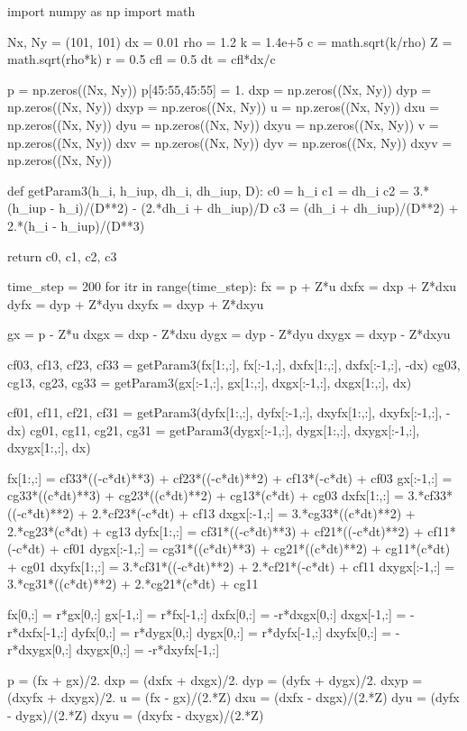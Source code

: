 \documentclass[dvipdfmx, 9pt, a4paper]{jsarticle}
\begin{document}
\begin{python}
import numpy as np
import math

Nx, Ny = (101, 101)
dx = 0.01
rho = 1.2
k = 1.4e+5
c = math.sqrt(k/rho)
Z = math.sqrt(rho*k)
r = 0.5
cfl = 0.5
dt = cfl*dx/c

p = np.zeros((Nx, Ny))
p[45:55,45:55] = 1.
dxp = np.zeros((Nx, Ny))
dyp = np.zeros((Nx, Ny))
dxyp = np.zeros((Nx, Ny))
u = np.zeros((Nx, Ny))
dxu = np.zeros((Nx, Ny))
dyu = np.zeros((Nx, Ny))
dxyu = np.zeros((Nx, Ny))
v = np.zeros((Nx, Ny))
dxv = np.zeros((Nx, Ny))
dyv = np.zeros((Nx, Ny))
dxyv = np.zeros((Nx, Ny))

def getParam3(h_i, h_iup, dh_i, dh_iup, D):
	c0 = h_i
	c1 = dh_i
	c2 = 3.*(h_iup - h_i)/(D**2) - (2.*dh_i + dh_iup)/D
	c3 = (dh_i + dh_iup)/(D**2) + 2.*(h_i - h_iup)/(D**3)

	return c0, c1, c2, c3

time_step = 200
for itr in range(time_step):
	fx = p + Z*u
	dxfx = dxp + Z*dxu
	dyfx = dyp + Z*dyu
	dxyfx = dxyp + Z*dxyu


	gx = p - Z*u
	dxgx = dxp - Z*dxu
	dygx = dyp - Z*dyu
	dxygx = dxyp - Z*dxyu

	cf03, cf13, cf23, cf33 = getParam3(fx[1:,:], fx[:-1,:], dxfx[1:,:], dxfx[:-1,:], -dx)
	cg03, cg13, cg23, cg33 = getParam3(gx[:-1,:], gx[1:,:], dxgx[:-1,:], dxgx[1:,:], dx)

	cf01, cf11, cf21, cf31 = getParam3(dyfx[1:,:], dyfx[:-1,:], dxyfx[1:,:], dxyfx[:-1,:], -dx)
	cg01, cg11, cg21, cg31 = getParam3(dygx[:-1,:], dygx[1:,:], dxygx[:-1,:], dxygx[1:,:], dx)

	fx[1:,:] = cf33*((-c*dt)**3) + cf23*((-c*dt)**2) + cf13*(-c*dt) + cf03
	gx[:-1,:] = cg33*((c*dt)**3) + cg23*((c*dt)**2) + cg13*(c*dt) + cg03
	dxfx[1:,:] = 3.*cf33*((-c*dt)**2) + 2.*cf23*(-c*dt) + cf13
	dxgx[:-1,:] = 3.*cg33*((c*dt)**2) + 2.*cg23*(c*dt) + cg13
	dyfx[1:,:] = cf31*((-c*dt)**3) + cf21*((-c*dt)**2) + cf11*(-c*dt) + cf01
	dygx[:-1,:] = cg31*((c*dt)**3) + cg21*((c*dt)**2) + cg11*(c*dt) + cg01
	dxyfx[1:,:] = 3.*cf31*((-c*dt)**2) + 2.*cf21*(-c*dt) + cf11
	dxygx[:-1,:] = 3.*cg31*((c*dt)**2) + 2.*cg21*(c*dt) + cg11

	fx[0,:] = r*gx[0,:]
	gx[-1,:] = r*fx[-1,:]
	dxfx[0,:] = -r*dxgx[0,:]
	dxgx[-1,:] = -r*dxfx[-1,:]
	dyfx[0,:] = r*dygx[0,:]
	dygx[0,:] = r*dyfx[-1,:]
	dxyfx[0,:] = -r*dxygx[0,:]
	dxygx[0,:] = -r*dxyfx[-1,:]

	p = (fx + gx)/2.
	dxp = (dxfx + dxgx)/2.
	dyp = (dyfx + dygx)/2.
	dxyp = (dxyfx + dxygx)/2.
	u = (fx - gx)/(2.*Z)
	dxu = (dxfx - dxgx)/(2.*Z)
	dyu = (dyfx - dygx)/(2.*Z)
	dxyu = (dxyfx - dxygx)/(2.*Z)


\end{python}
\end{document}
